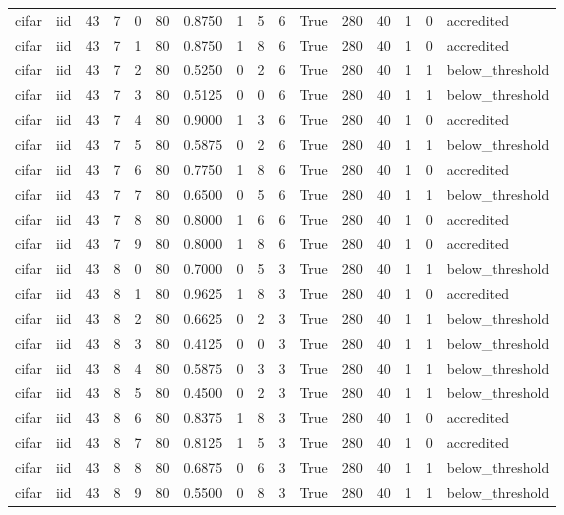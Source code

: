 \begin{tabular}{llrrrrrrrrrrrrrl}
cifar & iid & 43 & 7 & 0 & 80 & 0.8750 & 1 & 5 & 6 & True & 280 & 40 & 1 & 0 & accredited \\
cifar & iid & 43 & 7 & 1 & 80 & 0.8750 & 1 & 8 & 6 & True & 280 & 40 & 1 & 0 & accredited \\
cifar & iid & 43 & 7 & 2 & 80 & 0.5250 & 0 & 2 & 6 & True & 280 & 40 & 1 & 1 & below\_threshold \\
cifar & iid & 43 & 7 & 3 & 80 & 0.5125 & 0 & 0 & 6 & True & 280 & 40 & 1 & 1 & below\_threshold \\
cifar & iid & 43 & 7 & 4 & 80 & 0.9000 & 1 & 3 & 6 & True & 280 & 40 & 1 & 0 & accredited \\
cifar & iid & 43 & 7 & 5 & 80 & 0.5875 & 0 & 2 & 6 & True & 280 & 40 & 1 & 1 & below\_threshold \\
cifar & iid & 43 & 7 & 6 & 80 & 0.7750 & 1 & 8 & 6 & True & 280 & 40 & 1 & 0 & accredited \\
cifar & iid & 43 & 7 & 7 & 80 & 0.6500 & 0 & 5 & 6 & True & 280 & 40 & 1 & 1 & below\_threshold \\
cifar & iid & 43 & 7 & 8 & 80 & 0.8000 & 1 & 6 & 6 & True & 280 & 40 & 1 & 0 & accredited \\
cifar & iid & 43 & 7 & 9 & 80 & 0.8000 & 1 & 8 & 6 & True & 280 & 40 & 1 & 0 & accredited \\
cifar & iid & 43 & 8 & 0 & 80 & 0.7000 & 0 & 5 & 3 & True & 280 & 40 & 1 & 1 & below\_threshold \\
cifar & iid & 43 & 8 & 1 & 80 & 0.9625 & 1 & 8 & 3 & True & 280 & 40 & 1 & 0 & accredited \\
cifar & iid & 43 & 8 & 2 & 80 & 0.6625 & 0 & 2 & 3 & True & 280 & 40 & 1 & 1 & below\_threshold \\
cifar & iid & 43 & 8 & 3 & 80 & 0.4125 & 0 & 0 & 3 & True & 280 & 40 & 1 & 1 & below\_threshold \\
cifar & iid & 43 & 8 & 4 & 80 & 0.5875 & 0 & 3 & 3 & True & 280 & 40 & 1 & 1 & below\_threshold \\
cifar & iid & 43 & 8 & 5 & 80 & 0.4500 & 0 & 2 & 3 & True & 280 & 40 & 1 & 1 & below\_threshold \\
cifar & iid & 43 & 8 & 6 & 80 & 0.8375 & 1 & 8 & 3 & True & 280 & 40 & 1 & 0 & accredited \\
cifar & iid & 43 & 8 & 7 & 80 & 0.8125 & 1 & 5 & 3 & True & 280 & 40 & 1 & 0 & accredited \\
cifar & iid & 43 & 8 & 8 & 80 & 0.6875 & 0 & 6 & 3 & True & 280 & 40 & 1 & 1 & below\_threshold \\
cifar & iid & 43 & 8 & 9 & 80 & 0.5500 & 0 & 8 & 3 & True & 280 & 40 & 1 & 1 & below\_threshold \\

\end{tabular}
